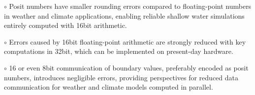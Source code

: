 \documentclass[draft]{agujournal2019}
\begin{document}





\begin{keypoints}
\item $\circ$ Posit numbers have smaller rounding errors compared to floating-point numbers in weather and climate applications, enabling reliable shallow water simulations entirely computed with 16bit arithmetic.

\item $\circ$ Errors caused by 16bit floating-point arithmetic are strongly reduced with key computations in 32bit, which can be implemented on present-day hardware.

\item $\circ$ 16 or even 8bit communication of boundary values, preferably encoded as posit numbers, introduces negligible errors, providing perspectives for reduced data communication for weather and climate models computed in parallel.

\end{keypoints}

%
%

%
%
\end{document}
